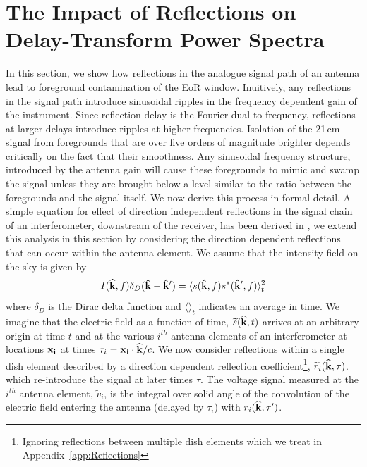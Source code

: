 \documentclass[onecolumn]{emulateapj}
\begin{document}
\section{The Impact of Reflections on Delay-Transform Power Spectra}\label{sec:Formalism}
In this section, we show how reflections in the analogue signal path of an antenna lead to foreground contamination of the EoR window. Inuitively, any reflections in the signal path introduce sinusoidal ripples in the frequency dependent gain of the instrument. Since reflection delay is the Fourier dual to frequency, reflections at larger delays introduce ripples at higher frequencies. Isolation of the 21\,cm signal from foregrounds that are over five orders of magnitude brighter depends critically on the fact that their smoothness. Any sinusoidal frequency structure, introduced by the antenna gain will cause these foregrounds to mimic and swamp the signal unless they are brought below a level similar to the ratio between the foregrounds and the signal itself. We now derive this process in formal detail. A simple equation for effect of direction independent reflections in the signal chain of an interferometer, downstream of the receiver, has been derived in \citep{EwallWice:2015a}, we extend this analysis in this section by considering the direction dependent reflections that can occur within the antenna element. We assume that the intensity field on the sky is given by 
\begin{equation}\label{eq:Dirac}
I({\bf \widehat{k}},f) \delta_D({\bf \hat{k}} - {\bf \hat{k}'})= \langle s({\bf \hat{k}},f)s^*({\bf \hat{k}'},f)  \rangle_t^2
\end{equation}
 where $\delta_D$ is the Dirac delta function and $\langle \rangle_t$ indicates an average in time. We imagine that the electric field as a function of time, $\widetilde{s}({\bf \widehat{k}},t)$ arrives at an arbitrary origin at time $t$ and at the various $i^{th}$ antenna elements of an interferometer at locations ${\bf x_i}$ at times $\tau_i={\bf x_i} \cdot {\bf \widehat{k}} /c$. We now consider reflections within a single dish element described by a direction dependent reflection coefficient\footnote{Ignoring reflections between multiple dish elements which we treat in Appendix~\ref{app:Reflections}}, $\widetilde{r}_i({\bf \widehat{k}},\tau)$. which re-introduce the signal at later times $\tau$. The voltage signal measured at the $i^{th}$ antenna element, $\widetilde{v}_i$, is the integral over solid angle of the convolution of the electric field entering the antenna (delayed by $\tau_i$) with $r_i({\bf \widehat{k}},\tau')$.
\end{document}
